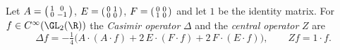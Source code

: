Let $A=\begin{psmallmatrix}1&0\\0&-1\end{psmallmatrix}$, $E=\begin{psmallmatrix}0&1\\0&0\end{psmallmatrix}$,
$F=\begin{psmallmatrix}0&0\\1&0\end{psmallmatrix}$ and let $1$ be the identity matrix. For $f\in C^\infty(\GL_2(\R))$
the \emph{Casimir operator} $\Delta$ and the \emph{central operator} $Z$ are
\[
  \Delta f=-\tfrac14\bigl(A\cdot(A\cdot f)+2\,E\cdot(F\cdot f)+2\,F\cdot(E\cdot f)\bigr),\qquad Zf=1\cdot f .
\]
